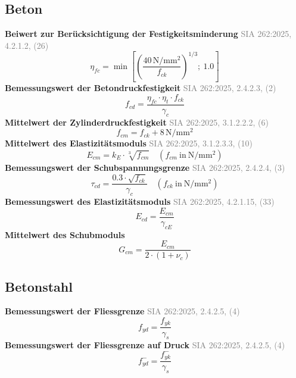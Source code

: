 \documentclass[11pt,a4paper]{article}
\newcommand{\normref}[1]{{\small\textcolor{gray}{#1}}}
\begin{document}
\subsection{Beton}
\noindent\textbf{Beiwert zur Berücksichtigung der Festigkeitsminderung} \hfill \normref{SIA 262:2025, 4.2.1.2, (26)}
\begin{equation*}
\eta_{fc} = \min\left[\left(\frac{40\,\mathrm{N}/\mathrm{mm}^{2}}{f_{ck}}\right)^{1/3};\ 1.0\right]
\end{equation*}
\noindent\textbf{Bemessungswert der Betondruckfestigkeit} \hfill \normref{SIA 262:2025, 2.4.2.3, (2)}
\begin{equation*}
f_{cd} = \frac{\eta_{fc} \cdot \eta_t \cdot f_{ck}}{\gamma_c}
\end{equation*}
\noindent\textbf{Mittelwert der Zylinderdruckfestigkeit} \hfill \normref{SIA 262:2025, 3.1.2.2.2, (6)}
\begin{equation*}
f_{cm} = f_{ck} + 8\,\mathrm{N}/\mathrm{mm}^{2}
\end{equation*}
\noindent\textbf{Mittelwert des Elastizitätsmoduls} \hfill \normref{SIA 262:2025, 3.1.2.3.3, (10)}
\begin{equation*}
E_{cm} = k_E \cdot \sqrt[3]{f_{cm}} \quad \left(f_{cm}\ \text{in}\ \mathrm{N}/\mathrm{mm}^{2}\right)
\end{equation*}
\noindent\textbf{Bemessungswert der Schubspannungsgrenze} \hfill \normref{SIA 262:2025, 2.4.2.4, (3)}
\begin{equation*}
\tau_{cd} = \frac{0.3 \cdot \sqrt{f_{ck}}}{\gamma_c} \quad \left(f_{ck}\ \text{in}\ \mathrm{N}/\mathrm{mm}^{2}\right)
\end{equation*}
\noindent\textbf{Bemessungswert des Elastizitätsmoduls} \hfill \normref{SIA 262:2025, 4.2.1.15, (33)}
\begin{equation*}
E_{cd} = \frac{E_{cm}}{\gamma_{cE}}
\end{equation*}
\noindent\textbf{Mittelwert des Schubmoduls}
\begin{equation*}
G_{cm} = \frac{E_{cm}}{2 \cdot \left(1 + \nu_c\right)}
\end{equation*}
\subsection{Betonstahl}
\noindent\textbf{Bemessungswert der Fliessgrenze} \hfill \normref{SIA 262:2025, 2.4.2.5, (4)}
\begin{equation*}
f_{yd} = \frac{f_{yk}}{\gamma_s}
\end{equation*}
\noindent\textbf{Bemessungswert der Fliessgrenze auf Druck} \hfill \normref{SIA 262:2025, 2.4.2.5, (4)}
\begin{equation*}
f_{yd}^{-} = \frac{f_{yk}^{-}}{\gamma_s}
\end{equation*}
\end{document}
